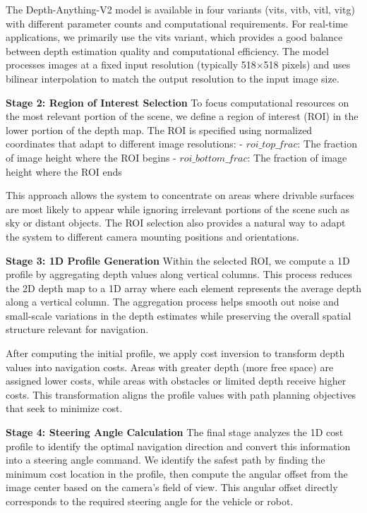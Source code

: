 \documentclass[conference]{IEEEtran}
\begin{document}
The Depth-Anything-V2 model is available in four variants (vits, vitb, vitl, vitg) with different parameter counts and computational requirements. For real-time applications, we primarily use the vits variant, which provides a good balance between depth estimation quality and computational efficiency. The model processes images at a fixed input resolution (typically 518×518 pixels) and uses bilinear interpolation to match the output resolution to the input image size.

\textbf{Stage 2: Region of Interest Selection}
To focus computational resources on the most relevant portion of the scene, we define a region of interest (ROI) in the lower portion of the depth map. The ROI is specified using normalized coordinates that adapt to different image resolutions:
- $roi\_top\_frac$: The fraction of image height where the ROI begins
- $roi\_bottom\_frac$: The fraction of image height where the ROI ends

This approach allows the system to concentrate on areas where drivable surfaces are most likely to appear while ignoring irrelevant portions of the scene such as sky or distant objects. The ROI selection also provides a natural way to adapt the system to different camera mounting positions and orientations.

\textbf{Stage 3: 1D Profile Generation}
Within the selected ROI, we compute a 1D profile by aggregating depth values along vertical columns. This process reduces the 2D depth map to a 1D array where each element represents the average depth along a vertical column. The aggregation process helps smooth out noise and small-scale variations in the depth estimates while preserving the overall spatial structure relevant for navigation.

After computing the initial profile, we apply cost inversion to transform depth values into navigation costs. Areas with greater depth (more free space) are assigned lower costs, while areas with obstacles or limited depth receive higher costs. This transformation aligns the profile values with path planning objectives that seek to minimize cost.

\textbf{Stage 4: Steering Angle Calculation}
The final stage analyzes the 1D cost profile to identify the optimal navigation direction and convert this information into a steering angle command. We identify the safest path by finding the minimum cost location in the profile, then compute the angular offset from the image center based on the camera's field of view. This angular offset directly corresponds to the required steering angle for the vehicle or robot.
\end{document}
